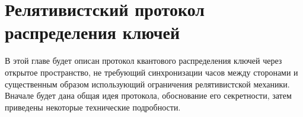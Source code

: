 \chapter{Релятивистский протокол распределения ключей}

В этой главе будет описан протокол квантового распределения ключей через открытое пространство, не требующий синхронизации часов между сторонами и существенным образом использующий ограничения релятивистской механики. Вначале будет дана общая идея протокола, обоснование его секретности, затем приведены некоторые технические подробности. 





